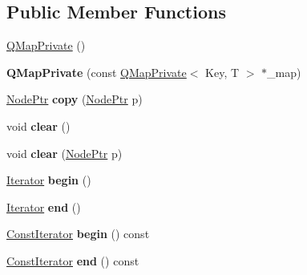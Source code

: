 \subsection*{Public Member Functions}
\begin{DoxyCompactItemize}
\item 
\mbox{\hyperlink{class_q_map_private_a4e52679058c7c68f4e188dbb1f81ddf2}{Q\+Map\+Private}} ()
\item 
\mbox{\label{class_q_map_private_a40c49fe36d6aac5a585ff81f219e484a}} 
{\bfseries Q\+Map\+Private} (const \mbox{\hyperlink{class_q_map_private}{Q\+Map\+Private}}$<$ Key, T $>$ $\ast$\+\_\+map)
\item 
\mbox{\label{class_q_map_private_ac3ec38438d60e749d58dd6e8d87f8231}} 
\mbox{\hyperlink{struct_q_map_node}{Node\+Ptr}} {\bfseries copy} (\mbox{\hyperlink{struct_q_map_node}{Node\+Ptr}} p)
\item 
\mbox{\label{class_q_map_private_a57cf7714f6cd6ce302f6869f61217e03}} 
void {\bfseries clear} ()
\item 
\mbox{\label{class_q_map_private_a0317f0056ee635561c57577291950cba}} 
void {\bfseries clear} (\mbox{\hyperlink{struct_q_map_node}{Node\+Ptr}} p)
\item 
\mbox{\label{class_q_map_private_a33ad6dc5d5c7c5292c6206445f7ec54a}} 
\mbox{\hyperlink{class_q_map_private_a5326545ba578532909650c2f4a8d4d34}{Iterator}} {\bfseries begin} ()
\item 
\mbox{\label{class_q_map_private_ad1b27b1ce057ef786f0d122dc3e71d12}} 
\mbox{\hyperlink{class_q_map_private_a5326545ba578532909650c2f4a8d4d34}{Iterator}} {\bfseries end} ()
\item 
\mbox{\label{class_q_map_private_ad28141759039945809e2976be8d58ccb}} 
\mbox{\hyperlink{class_q_map_const_iterator}{Const\+Iterator}} {\bfseries begin} () const
\item 
\mbox{\label{class_q_map_private_a87c89fffc9db1d29125ba0d8e408b795}} 
\mbox{\hyperlink{class_q_map_const_iterator}{Const\+Iterator}} {\bfseries end} () const

\end{DoxyCompactItemize}
